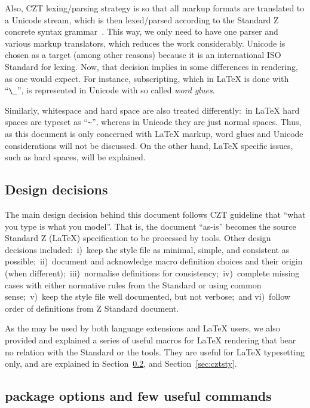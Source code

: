 \documentclass{article}
\begin{document}
Also, CZT lexing/parsing strategy is so that all markup formats are translated
to a Unicode stream, which is then lexed/parsed according to the Standard Z
concrete syntax grammar~\cite[Ch.~8]{isoz}. This way, we only need to have one parser and various
markup translators, which reduces the work considerably. Unicode is chosen as
a target (among other reasons) because it is an international ISO Standard for lexing. Now, that
decision implies in some differences in rendering, as one would expect. For
instance, subscripting, which in \LaTeX{} is done with ``\verb|\_|'', is represented
in Unicode with so called \textit{word glues}.

Similarly, whitespace and hard space are also treated differently:~in \LaTeX{}
hard spaces are typeset as ``\verb|~|'', whereas in Unicode they are just normal spaces. Thus,
as this document is only concerned with \LaTeX{} markup, word glues and Unicode
considerations will not be discussed. On the other hand, \LaTeX{} specific issues,
such as hard spaces, will be explained.

\subsection{Design decisions}\label{sec:intro-design}

The main design decision behind this document follows CZT guideline that
``what you type is what you model''. That is, the document ``as-is'' becomes
the source Standard Z (\LaTeX) specification to be processed by tools. Other
design decisions included:~i)~keep the style file as minimal, simple, and
consistent as possible;~ii)~document and acknowledge macro definition choices
and their origin (when different);~iii)~normalise definitions for
consistency;~iv)~complete missing cases with either normative rules from
the Standard or using common sense;~v)~keep the style file well documented,
but not verbose;~and vi)~follow order of definitions from Z Standard document.

As the \cztstylefile{} may be used by both language extensions and \LaTeX{} users,
we also provided and explained a series of useful macros for \LaTeX{} rendering
that bear no relation with the Standard or the tools. They are useful for \LaTeX{}
typesetting only, and are explained in Section~\ref{sec:intro-cztopt}, and
Section~\ref{sec:cztsty}.

\subsection{\cztstylefile{} package options and few useful commands}\label{sec:intro-cztopt}
\end{document}
